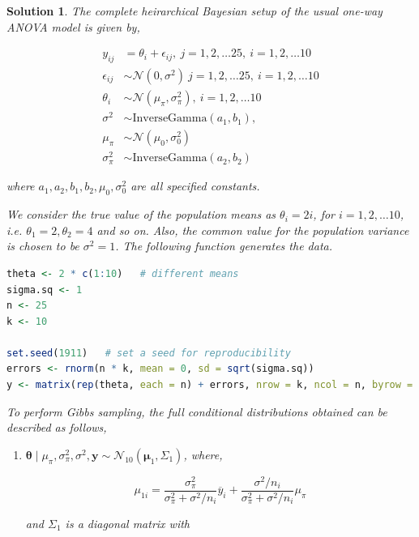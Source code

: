 \documentclass[12pt]{article}
\theoremstyle{problemstyle}
\newtheorem*{solution*}{Solution}
\newcommand{\normal}{\mathcal{N}}
\newcommand{\bb}[1]{\boldsymbol{#1}}
\begin{document}
\begin{solution*}
    The complete heirarchical Bayesian setup of the usual one-way ANOVA model is given by,

    \begin{align*}
        y_{ij} & = \theta_i + \epsilon_{ij}, \ j = 1, 2, \dots 25, \ i = 1, 2, \dots 10\\
        \epsilon_{ij} & \sim \normal(0, \sigma^2) \ j = 1, 2, \dots 25, \ i = 1, 2, \dots 10\\
        \theta_i & \sim \normal(\mu_\pi, \sigma^2_\pi), \ i = 1, 2, \dots 10\\
        \sigma^2 & \sim \text{InverseGamma}(a_1, b_1), \\
        \mu_{\pi} & \sim \normal(\mu_0, \sigma_0^2)\\
        \sigma^2_\pi & \sim \text{InverseGamma}(a_2, b_2)
    \end{align*}

    where $a_1, a_2, b_1, b_2, \mu_0, \sigma^2_0$ are all specified constants.

    We consider the true value of the population means as $\theta_i = 2i$, for $i = 1, 2, \dots 10$, i.e. $\theta_1 = 2, \theta_2 = 4$ and so on. Also, the common value for the population variance is chosen to be $\sigma^2 = 1$. The following function generates the data.
    
    \begin{lstlisting}[language = R]
theta <- 2 * c(1:10)   # different means
sigma.sq <- 1
n <- 25
k <- 10

set.seed(1911)   # set a seed for reproducibility
errors <- rnorm(n * k, mean = 0, sd = sqrt(sigma.sq))
y <- matrix(rep(theta, each = n) + errors, nrow = k, ncol = n, byrow = TRUE)
    \end{lstlisting}
        

    To perform Gibbs sampling, the full conditional distributions obtained can be described as follows,

    \begin{enumerate}
        \item $\bb{\theta} \mid \mu_\pi, \sigma^2_\pi, \sigma^2, \bb{y} \sim \normal_{10}(\bb{\mu}_1, \Sigma_1)$, where,
        
        $$
        \mu_{1i} = \dfrac{\sigma_\pi^2}{\sigma_\pi^2 + \sigma^2/n_i} \overline{y}_i + \dfrac{\sigma^2 / n_i}{\sigma_\pi^2 + \sigma^2/n_i} \mu_\pi
        $$

        and $\Sigma_1$ is a diagonal matrix with


\end{enumerate}
\end{solution*}
\end{document}
